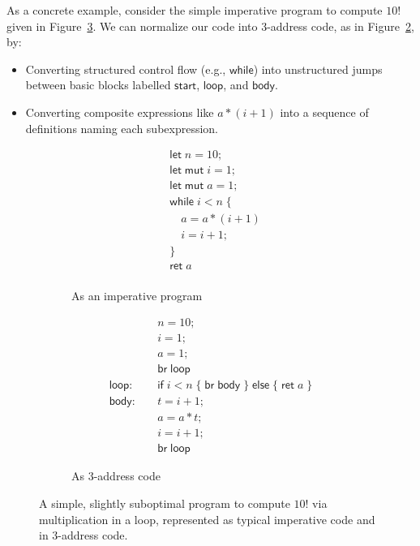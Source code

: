 \documentclass[acmsmall,screen,review]{acmart}
\newcommand{\ms}[1]{\ensuremath{\mathsf{#1}}}
\begin{document}
As a concrete example, consider the simple imperative program to compute $10!$ given in
Figure~\ref{fig:fact-program}. We can normalize our code into 3-address code, as in
Figure~\ref{fig:fact-3addr}, by:
\begin{itemize}
  \item Converting structured control flow (e.g., \ms{while}) into unstructured jumps between basic
  blocks labelled \ms{start}, \ms{loop}, and \ms{body}.
  \item Converting composite expressions like $a * (i + 1)$ into a sequence of definitions naming each
  subexpression. 
\end{itemize}

\begin{figure}
  \begin{subfigure}[t]{.5\textwidth}
    \begin{align*}
      & \ms{let}\;n = 10; \\
      & \ms{let\;mut}\;i = 1; \\
      & \ms{let\;mut}\;a = 1; \\
      & \ms{while}\;i < n\;\{ \\
      & \quad a = a * (i + 1) \\
      & \quad i = i + 1; \\
      & \} \\
      & \ms{ret}\;a \\
    \end{align*}
    \caption{As an imperative program}
    \label{fig:fact-imp}
  \end{subfigure}%
  \begin{subfigure}[t]{.5\textwidth}
    \begin{align*}
                        & n = 10; \\
                        & i = 1; \\
                        & a = 1; \\
                        & \ms{br}\;\ms{loop} \\
      \ms{loop}: \quad  & \ms{if}\;i < n\;
                          \{\;\ms{br}\;\ms{body}\;\}\;
                          \ms{else}\;\{\;\ms{ret}\;a\;\} \\
      \ms{body}: \quad  & t = i + 1; \\
                        & a = a * t; \\
                        & i = i + 1; \\
                        & \ms{br}\;\ms{loop}
    \end{align*}
    \caption{As 3-address code}
    \label{fig:fact-3addr}
  \end{subfigure}
  \caption{
    A simple, slightly suboptimal program to compute $10!$ via multiplication in a loop, represented
    as typical imperative code and in 3-address code.
  }
  \Description{}
  \label{fig:fact-program}
\end{figure}
\end{document}
